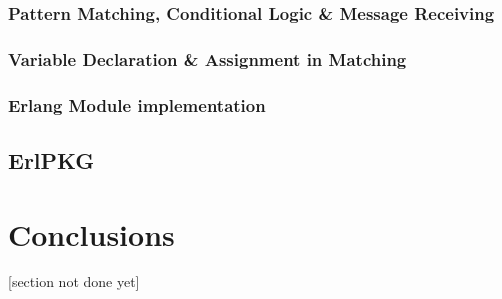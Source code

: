 \documentclass[twoside,12pt,titlepage,a4paper]{article}
\begin{document}


\subsubsection{Pattern Matching, Conditional Logic \& Message Receiving}
\subsubsection{Variable Declaration \& Assignment in Matching}
\subsubsection{Erlang Module implementation} \label{sssec:num1}
\subsection{ErlPKG}

\section{Conclusions}
\label{Conclusions}

[section not done yet]
\end{document}

